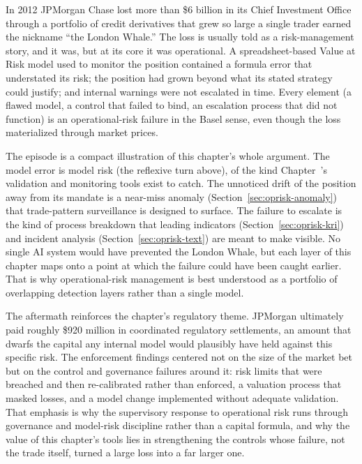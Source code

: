 \documentclass[../ai_in_finance]{subfiles}
\begin{document}
In 2012 JPMorgan Chase lost more than \$6 billion in its Chief Investment Office through a portfolio of credit derivatives that grew so large a single trader earned the nickname ``the London Whale.'' The loss is usually told as a risk-management story, and it was, but at its core it was operational. A spreadsheet-based Value at Risk model used to monitor the position contained a formula error that understated its risk; the position had grown beyond what its stated strategy could justify; and internal warnings were not escalated in time. Every element (a flawed model, a control that failed to bind, an escalation process that did not function) is an operational-risk failure in the Basel sense, even though the loss materialized through market prices.

The episode is a compact illustration of this chapter's whole argument. The model error is model risk (the reflexive turn above), of the kind Chapter~'s validation and monitoring tools exist to catch. The unnoticed drift of the position away from its mandate is a near-miss anomaly (Section~\ref{sec:oprisk-anomaly}) that trade-pattern surveillance is designed to surface. The failure to escalate is the kind of process breakdown that leading indicators (Section~\ref{sec:oprisk-kri}) and incident analysis (Section~\ref{sec:oprisk-text}) are meant to make visible. No single AI system would have prevented the London Whale, but each layer of this chapter maps onto a point at which the failure could have been caught earlier. That is why operational-risk management is best understood as a portfolio of overlapping detection layers rather than a single model.

The aftermath reinforces the chapter's regulatory theme. JPMorgan ultimately paid roughly \$920 million in coordinated regulatory settlements, an amount that dwarfs the capital any internal model would plausibly have held against this specific risk. The enforcement findings centered not on the size of the market bet but on the control and governance failures around it: risk limits that were breached and then re-calibrated rather than enforced, a valuation process that masked losses, and a model change implemented without adequate validation. That emphasis is why the supervisory response to operational risk runs through governance and model-risk discipline rather than a capital formula, and why the value of this chapter's tools lies in strengthening the controls whose failure, not the trade itself, turned a large loss into a far larger one.
\end{document}
